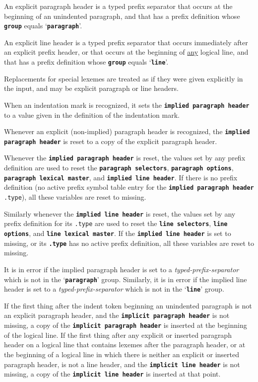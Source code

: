 \documentclass[12pt]{article}
\newcommand{\TT}[1]{{\tt \bfseries #1}}
\begin{document}
An explicit paragraph header is a typed prefix separator that
occurs at the beginning of an unindented paragraph,
and that has a prefix definition whose \TT{group} equals
`\TT{paragraph}'.

An explicit line header is a typed prefix separator that
occurs immediately after an explicit prefix header, or that
occurs at the beginning of \underline{any} logical line,
and that has a prefix definition whose \TT{group} equals
`\TT{line}'.

Replacements for special lexemes are treated
as if they were given explicitly in the input, and may be explicit
paragraph or line headers.

When an indentation mark is recognized, it sets the \TT{implied paragraph
header} to a value given in the definition of the indentation mark.

Whenever an explicit (non-implied) paragraph header is recognized,
the \TT{implied paragraph header} is reset to a copy of the
explicit paragraph header.

Whenever the \TT{implied paragraph header} is reset, the values
set by any prefix definition
are used to reset the \TT{paragraph selectors},
\TT{paragraph options}, \TT{paragraph lexical master}, and
\TT{implied line header}.
If there is no prefix definition (no active prefix symbol table
entry for the \TT{implied paragraph header} {\tt.type}),
all these variables are reset to missing.

Similarly whenever the \TT{implied line header} is reset, the values
set by any prefix definition
for its {\tt .type} are used to reset the \TT{line selectors},
\TT{line options}, and \TT{line lexical master}.  If the \TT{implied
line header} is set to missing, or its \TT{.type} has
no active prefix definition,
all these variables are reset to missing.

It is in error if the implied paragraph header is set to a
{\em typed-prefix-separator} which is not in the `\TT{paragraph}'
group.  Similarly, it is in error if the implied line header is set to a
{\em typed-prefix-separator} which is not in the `\TT{line}' group.

If the first thing after the indent token beginning an unindented
paragraph is not an explicit paragraph header,
and the \TT{implicit paragraph header} is not missing, a copy
of the \TT{im\-pli\-cit paragraph header} is inserted at the beginning of
the logical line.  If the first thing after any explicit or inserted
paragraph header on a logical line that contains lexemes after
the paragraph header, or at the beginning of a logical line in which there
is neither an explicit or inserted paragraph header, is not a line
header, and the \TT{implicit line header} is not missing, a copy
of the \TT{implicit line header} is inserted at that point.
\end{document}

